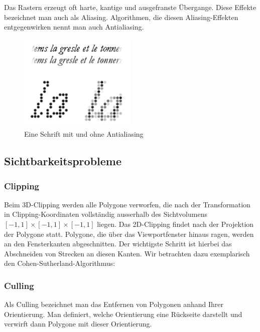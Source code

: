 Das Rastern erzeugt oft harte, kantige und ausgefranste Übergange. Diese Effekte bezeichnet man auch als Aliasing. Algorithmen, die diesen Aliasing-Effekten entgegenwirken nennt man auch 
Antialiasing. 
\begin{figure}[H]
    \centering
    \includegraphics[width=0.5\textwidth]{images/Antialiasing.png}
    \caption{Eine Schrift mit und ohne Antialiasing}
    \label{fig:screening-antialiasing-font}
\end{figure}


\subsection*{Sichtbarkeitsprobleme}

\subsubsection*{Clipping}
Beim 3D-Clipping werden alle Polygone verworfen, die nach der Transformation in Clipping-Koordinaten vollständig ausserhalb des Sichtvolumens
$[-1,1] \times [-1,1] \times [-1,1] $ liegen. Das 2D-Clipping findet nach der Projektion der Polygone statt. Polygone, die über das Viewportfenster hinaus ragen, werden an den Fensterkanten abgeschnitten.
Der wichtigste Schritt ist hierbei das Abschneiden von Strecken an diesen Kanten. Wir betrachten dazu exemplarisch den Cohen-Sutherland-Algorithmus:

\begin{Algorithmus}
\end{Algorithmus}

\subsubsection*{Culling}
Als Culling bezeichnet man das Entfernen von Polygonen anhand Ihrer Orientierung. Man definiert, welche Orientierung eine Rückseite darstellt und verwirft dann Polygone mit dieser Orientierung.

